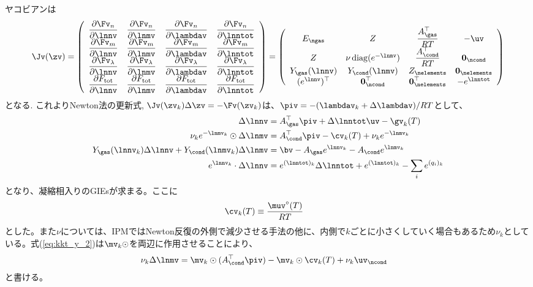 ヤコビアンは
\begin{equation}
\label{eq:jacobian_tce_cond}
\Jv (\zv) =
\left(
\begin{array}{cccc}
    \dfrac{\partial \Fv_n}{\partial \lnnv}  &  \dfrac{\partial \Fv_n}{\partial \lnmv} & \dfrac{\partial \Fv_n}{\partial \lambdav}& \dfrac{\partial \Fv_n}{\partial \lnntot}\\ 
    \dfrac{\partial \Fv_m}{\partial \lnnv}  &  \dfrac{\partial \Fv_m}{\partial \lnmv} & \dfrac{\partial \Fv_m}{\partial \lambdav}&  \dfrac{\partial \Fv_m}{\partial \lnntot}\\
    \dfrac{\partial \Fv_\lambda}{\partial \lnnv}  &  \dfrac{\partial \Fv_\lambda}{\partial \lnmv} & \dfrac{\partial \Fv_\lambda}{\partial \lambdav}& \dfrac{\partial \Fv_\lambda}{\partial \lnntot}\\
    \dfrac{\partial F_\mathrm{tot}}{\partial \lnnv}  &  \dfrac{\partial F_\mathrm{tot}}{\partial \lnmv} & \dfrac{\partial F_\mathrm{tot}}{\partial \lambdav}&  \dfrac{\partial F_\mathrm{tot}}{\partial \lnntot}\\
\end{array}
\right) =
\left(
\begin{array}{cccc}
 E_\ngas & Z & \dfrac{A_\gas^\top}{RT} &  - \uv \\ 
 Z & \nu \, \mathrm{diag} (e^{-\lnmv}) & \dfrac{A_\cond^\top}{RT} &  \boldsymbol{0}_\ncond \\
 Y_\gas(\lnnv) & Y_\cond (\lnmv) & Z_\nelements &  \boldsymbol{0}_\nelements \\ 
 (e^{\lnnv})^\top & \boldsymbol{0}_\ncond^\top & \boldsymbol{0}_\nelements^\top & - e^{\lnntot}\\  
\end{array}
\right)
\end{equation}
となる. これよりNewton法の更新式, $\Jv (\zv_k) \Delta \zv = - \Fv(\zv_k)$は、$\piv = - (\lambdav_k + \Delta \lambdav)/RT$として、
\begin{align}
\label{eq:kkt_y_1}
    \Delta \lnnv &= A_\gas^\top \piv + \Delta \lnntot \uv - \gv_k (T) \\
\label{eq:kkt_y_2}
      \nu_k e^{- \lnmv_k} \odot \Delta \lnmv &= A_\cond^\top \piv - \cv_k (T) + \nu_k e^{-\lnmv_k} \\
\label{eq:kkt_y_3}
    Y_\gas (\lnnv_k) \Delta \lnnv + Y_\cond (\lnmv_k) \Delta \lnmv &= \bv - A_\gas e^{\lnnv_k} - A_\cond e^{\lnmv_k} \\
\label{eq:kkt_y_5}
    e^{\lnnv_k} \cdot \Delta \lnnv &= e^{(\lnntot)_k} \Delta \lnntot + e^{(\lnntot)_k} - \sum_i e^{(q_i)_k} 
\end{align}
となり、凝縮相入りのGIEsが求まる。ここに
\begin{align}
    \cv_k (T) &\equiv \frac{\muv^\circ(T)}{RT} 
\end{align}
とした。また$\nu$については、IPMではNewton反復の外側で減少させる手法の他に、内側で$k$ごとに小さくしていく場合もあるため$\nu_k$としている。式(\ref{eq:kkt_y_2})は$\mv_k \odot$を両辺に作用させることにより、
\begin{align}
\label{eq:kkt_y_2_a}
      \nu_k \Delta \lnmv &=  \mv_k \odot (A_\cond^\top \piv) - \mv_k \odot \cv_k (T) + \nu_k \uv_\ncond
\end{align}
と書ける。


